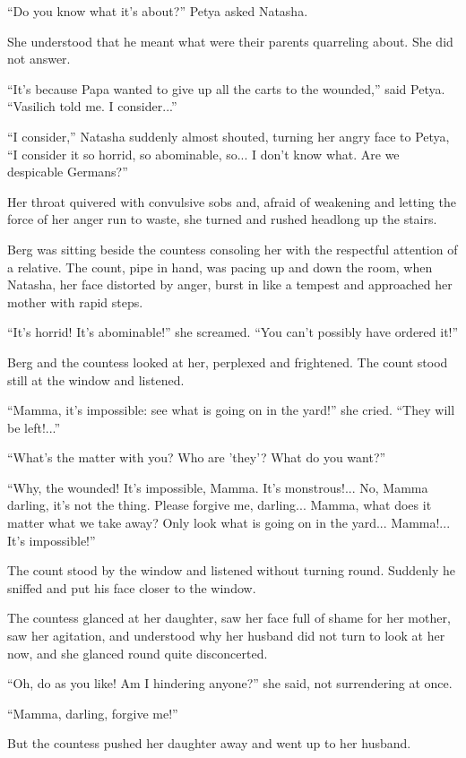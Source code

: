 ``Do you know what it's about?'' Petya asked Natasha.

She understood that he meant what were their parents quarreling
about.  She did not answer.

``It's because Papa wanted to give up all the carts to the
wounded,'' said Petya. ``Vasilich told me. I consider...''

``I consider,'' Natasha suddenly almost shouted, turning her
angry face to Petya, ``I consider it so horrid, so abominable,
so... I don't know what.  Are we despicable Germans?''

Her throat quivered with convulsive sobs and, afraid of weakening
and letting the force of her anger run to waste, she turned and
rushed headlong up the stairs.

Berg was sitting beside the countess consoling her with the
respectful attention of a relative. The count, pipe in hand, was
pacing up and down the room, when Natasha, her face distorted by
anger, burst in like a tempest and approached her mother with
rapid steps.

``It's horrid! It's abominable!'' she screamed. ``You can't
possibly have ordered it!''

Berg and the countess looked at her, perplexed and
frightened. The count stood still at the window and listened.

``Mamma, it's impossible: see what is going on in the yard!'' she
cried.  ``They will be left!...''

``What's the matter with you? Who are 'they'? What do you want?''

``Why, the wounded! It's impossible, Mamma. It's
monstrous!... No, Mamma darling, it's not the thing. Please
forgive me, darling... Mamma, what does it matter what we take
away? Only look what is going on in the yard... Mamma!... It's
impossible!''

The count stood by the window and listened without turning round.
Suddenly he sniffed and put his face closer to the window.

The countess glanced at her daughter, saw her face full of shame
for her mother, saw her agitation, and understood why her husband
did not turn to look at her now, and she glanced round quite
disconcerted.

``Oh, do as you like! Am I hindering anyone?'' she said, not
surrendering at once.

``Mamma, darling, forgive me!''

But the countess pushed her daughter away and went up to her
husband.


